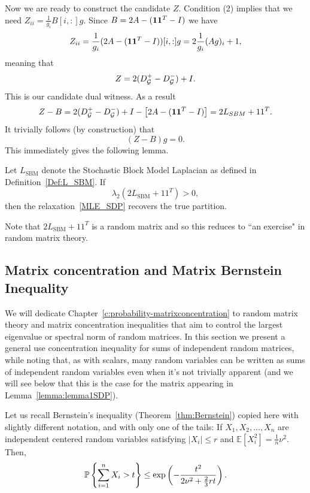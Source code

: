 Now we are ready to construct the candidate $Z$. Condition (2) implies that we need $Z_{ii} = \frac1{g_i}B[i,:]g$. Since $B = 2A - (\mathbf{1}\mathbf{1}^T -I)$ we have
\[
Z_{ii} = \frac1{g_i}(2A - (\mathbf{1}\mathbf{1}^T -I))[i,:]g = 2\frac1{g_i}(Ag)_i + 1,
\]
meaning that
\[
Z = 2(D_{\mathcal{G}}^+-D_{\mathcal{G}}^-) + I.
\]
This is our candidate dual witness.
As a result
\[
Z - B = 2(D_{\mathcal{G}}^+-D_{\mathcal{G}}^-) + I - \left[ 2A - (\mathbf{1}\mathbf{1}^T -I) \right] = 2 L_{SBM} +11^T.
\]
It trivially follows (by construction) that
\[
(Z-B)g = 0.
\]
This immediately gives the following lemma.

\begin{lemma} \label{lemma:lemma1SDP}
Let $L_{\text{SBM}}$ denote the Stochastic Block Model Laplacian as defined in Definition~\ref{Def:L_SBM}. If
\begin{equation}
\lambda_2(2 L_{\text{SBM}} +11^T) >0 \label{SDP:condition},
\end{equation}
then the relaxation~\eqref{MLE_SDP} recovers the true partition.
\end{lemma}
Note that $2 L_{\text{SBM}} +11^T$ is a random matrix and so this reduces to ``an exercise" in random matrix theory.







\subsection{Matrix concentration and Matrix Bernstein Inequality}\label{sc:matrixBernstein}

We will dedicate Chapter~\ref{c:probability-matrixconcentration} to random matrix theory and matrix concentration inequalities that aim to control the largest eigenvalue or spectral norm of random matrices. 
In this section we present a general use concentration inequality for sums of independent random matrices, while noting that, as with scalars, many random variables can be written as sums of independent random variables even when it's not trivially apparent (and we will see below that this is the case for the matrix appearing in Lemma~\ref{lemma:lemma1SDP}).

Let us recall Bernstein's inequality (Theorem~\ref{thm:Bernstein}) copied here with slightly different notation, and with only one of the tails: If $X_1,X_2,\ldots,X_n$ are independent centered random variables satisfying $|X_i| \leq r$ and $\mathbb{E}[X_i^2]=\frac1n\nu^2$. Then,
\begin{equation}\label{prob:Bernstein:scalar}
{\mathbb{P}} \left\{ \sum_{i=1}^n X_i > t \right\} \leq \exp\left(-\frac{t^2}{2\nu^2 + \frac{2}{3}rt}\right).
\end{equation}

